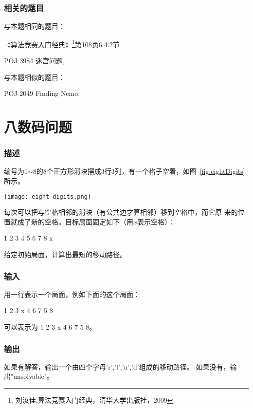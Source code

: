 \subsubsection{相关的题目}
与本题相同的题目：
\begindot
\item 《算法竞赛入门经典》\footnote{刘汝佳,算法竞赛入门经典，清华大学出版社，2009}第108页6.4.2节
\item  POJ 3984 迷宫问题, 
\myenddot

与本题相似的题目：
\begindot
\item  POJ 2049 Finding Nemo, 
\myenddot


\section{八数码问题} %
\label{subsec:eightDigits}

\subsubsection{描述}
编号为1$\sim$8的8个正方形滑块摆成3行3列，有一个格子空着，如图~\ref{fig:eightDigits}所示。

\begin{center}
\texttt{[image: eight-digits.png]}\\
\label{fig:eightDigits}
\end{center}

每次可以把与空格相邻的滑块（有公共边才算相邻）移到空格中，而它原
来的位置就成了新的空格。目标局面固定如下（用$x$表示空格）：
\begin{Code}
1 2 3
4 5 6
7 8 x
\end{Code}

给定初始局面，计算出最短的移动路径。

\subsubsection{输入}
用一行表示一个局面，例如下面的这个局面：
\begin{Code}
 1  2  3
 x  4  6
 7  5  8
\end{Code}
可以表示为 1 2 3 x 4 6 7 5 8。 

\subsubsection{输出}
如果有解答，输出一个由四个字母'r','l','u','d'组成的移动路径。
如果没有，输出"unsolvable"。 

